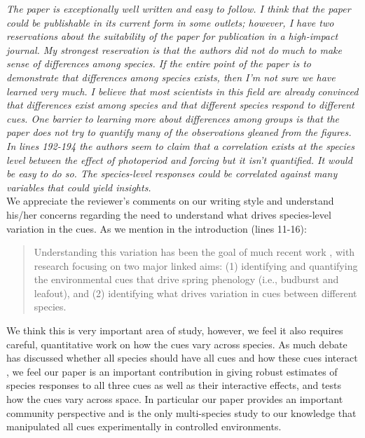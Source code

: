 \documentclass[11pt,a4paper]{article}
\begin{document}
\emph{The paper is exceptionally well written and easy to follow. I think that the paper could be
publishable in its current form in some outlets; however, I have two reservations about the
suitability of the paper for publication in a high-impact journal. My strongest reservation
is that the authors did not do much to make sense of differences among species. If the entire
point of the paper is to demonstrate that differences among species exists, then I'm not sure
we have learned very much. I believe that most scientists in this field are already convinced
that differences exist among species and that different species respond to different cues. One barrier to learning more about differences among groups is that the paper does not try to quantify many of the observations gleaned from the figures. In lines 192-194 the authors seem
to claim that a correlation exists at the species level between the effect of photoperiod and
forcing but it isn't quantified. It would be easy to do so. The species-level responses could be correlated against many variables that could yield insights.}\\

We appreciate the reviewer's comments on our writing style and understand his/her concerns regarding the need to understand what drives species-level variation in the cues. As we mention in the introduction (lines 11-16):

\begin{quote}
Understanding this variation has been the goal of much recent work \citep{Rutishauser:2008fu,Laube2015,donnelly2017,zohner2017}, with research focusing on two major linked aims: (1) identifying and quantifying the environmental cues that drive spring phenology (i.e., budburst and leafout), and (2) identifying what drives variation in cues between different species.
\end{quote}
We think this is very important area of study, however, we feel it also requires careful, quantitative work on how the cues vary across species. As much debate has discussed whether all species should have all cues and how these cues interact \citep{Korner:2010,Chuine:xb}, we feel our paper is an important contribution in giving robust estimates of species responses to all three cues as well as their interactive effects, and tests how the cues vary across space. In particular our paper provides an important community perspective and is the only multi-species study to our knowledge that manipulated all cues experimentally in controlled environments. \\
\end{document}
